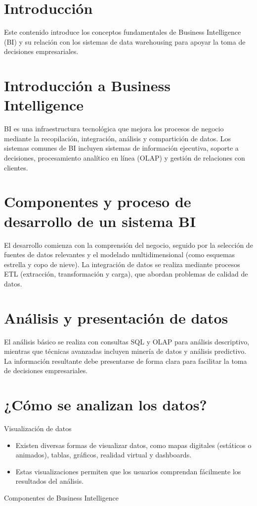 \documentclass[11pt,letterpaper]{article}
\begin{document}
\section*{Introducción}
 
Este contenido introduce los conceptos fundamentales de Business Intelligence (BI) y su relación con los sistemas de data warehousing para apoyar la toma de decisiones empresariales.

\section{Introducción a Business Intelligence}
BI es una infraestructura tecnológica que mejora los procesos de negocio mediante 
la recopilación, integración, análisis y compartición de datos. Los sistemas comunes 
de BI incluyen sistemas de información ejecutiva, soporte a decisiones, procesamiento 
analítico en línea (OLAP) y gestión de relaciones con clientes. 
\section{Componentes y proceso de desarrollo de un sistema BI} 
El desarrollo comienza con la comprensión del negocio, 
seguido por la selección de fuentes de datos relevantes y el modelado multidimensional
(como esquemas estrella y copo de nieve). La integración de datos se realiza
mediante procesos ETL (extracción, transformación y carga), que abordan
problemas de calidad de datos. 
\section{Análisis y presentación de datos} 
El análisis básico se realiza con consultas SQL y OLAP para análisis descriptivo, mientras
que técnicas avanzadas incluyen minería de datos y análisis predictivo. La
información resultante debe presentarse de forma clara para facilitar la toma de
decisiones empresariales. 
\section{¿Cómo se analizan los datos?} 
Visualización de datos
\begin{itemize}
	\item Existen diversas formas de visualizar datos, como mapas digitales
(estáticos o animados), tablas, gráficos, realidad virtual y dashboards.
\end{itemize}


\begin{itemize}
	\item Estas visualizaciones permiten que los usuarios comprendan fácilmente
los resultados del análisis.
\end{itemize}
Componentes de Business Intelligence
\end{document}

